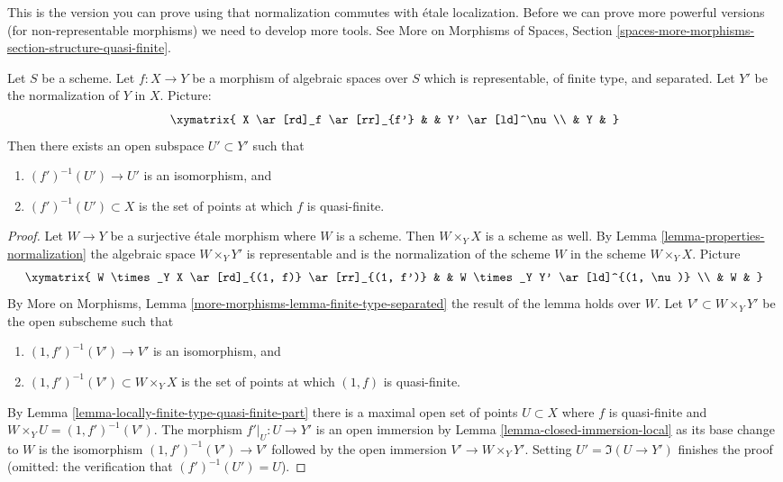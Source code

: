 \noindent
This is the version you can prove using that normalization
commutes with \'etale localization. Before we can prove more
powerful versions (for non-representable morphisms) we need to
develop more tools. See
More on Morphisms of Spaces, Section
\ref{spaces-more-morphisms-section-structure-quasi-finite}.

\begin{lemma}
\label{lemma-finite-type-separated}
Let $S$ be a scheme. Let $f : X \to Y$ be a morphism of algebraic
spaces over $S$ which is representable, of finite type, and separated.
Let $Y'$ be the normalization of $Y$ in $X$. Picture:
$$
\xymatrix{
X \ar[rd]_f \ar[rr]_{f'} & & Y' \ar[ld]^\nu \\
& Y &
}
$$
Then there exists an open subspace $U' \subset Y'$ such that
\begin{enumerate}
\item $(f')^{-1}(U') \to U'$ is an isomorphism, and
\item $(f')^{-1}(U') \subset X$ is the set of points at which
$f$ is quasi-finite.
\end{enumerate}
\end{lemma}

\begin{proof}
Let $W \to Y$ be a surjective \'etale morphism where $W$ is a scheme.
Then $W \times_Y X$ is a scheme as well. By
Lemma \ref{lemma-properties-normalization}
the algebraic space $W \times_Y Y'$ is representable and is
the normalization of the scheme $W$ in the scheme $W \times_Y X$. Picture
$$
\xymatrix{
W \times_Y X \ar[rd]_{(1, f)} \ar[rr]_{(1, f')} & &
W \times_Y Y' \ar[ld]^{(1, \nu)} \\
& W &
}
$$
By More on Morphisms, Lemma \ref{more-morphisms-lemma-finite-type-separated}
the result of the lemma holds over $W$. Let $V' \subset W \times_Y Y'$
be the open subscheme such that
\begin{enumerate}
\item $(1, f')^{-1}(V') \to V'$ is an isomorphism, and
\item $(1, f')^{-1}(V') \subset W \times_Y X$ is the set of points at which
$(1, f)$ is quasi-finite.
\end{enumerate}
By Lemma \ref{lemma-locally-finite-type-quasi-finite-part}
there is a maximal open set of points $U \subset X$ where $f$
is quasi-finite and $W \times_Y U = (1, f')^{-1}(V')$.
The morphism $f'|_U : U \to Y'$ is an open immersion
by Lemma \ref{lemma-closed-immersion-local}
as its base change to $W$ is the isomorphism $(1, f')^{-1}(V') \to V'$
followed by the open immersion $V' \to W \times_Y Y'$.
Setting $U' = \Im(U \to Y')$ finishes the proof
(omitted: the verification that $(f')^{-1}(U') = U$).
\end{proof}

